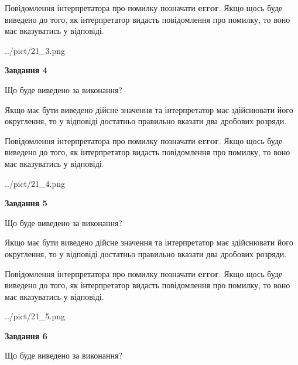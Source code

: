 \documentclass[12pt, ukrainian]{article}
\begin{document}
{\begin {Large}
Повідомлення інтерпретатора про помилку позначати \textbf{error}.
Якщо щось буде виведено до того, як інтерпретатор видасть повідомлення про помилку, 
то воно має вказуватись у відповіді. \par

\begin{center}
	{../pict/21_3.png}
\end{center}
\newpage

{\begin {center}\textbf{Завдання 4}\end {center}}\par
Що буде виведено за виконання? \par

Якщо має бути виведено дійсне значення та інтерпретатор має здійснювати його округлення, 
то у відповіді достатньо правильно вказати два дробових розряди.

Повідомлення інтерпретатора про помилку позначати \textbf{error}.
Якщо щось буде виведено до того, як інтерпретатор видасть повідомлення про помилку, 
то воно має вказуватись у відповіді. \par

\begin{center}
	{../pict/21_4.png}
\end{center}
\newpage

{\begin {center}\textbf{Завдання 5}\end {center}}\par
Що буде виведено за виконання? \par

Якщо має бути виведено дійсне значення та інтерпретатор має здійснювати його округлення, 
то у відповіді достатньо правильно вказати два дробових розряди.

Повідомлення інтерпретатора про помилку позначати \textbf{error}.
Якщо щось буде виведено до того, як інтерпретатор видасть повідомлення про помилку, 
то воно має вказуватись у відповіді. \par

\begin{center}
	{../pict/21_5.png}
\end{center}
\newpage

{\begin {center}\textbf{Завдання 6}\end {center}}\par
Що буде виведено за виконання? \par


\end{Large}}
\end{document}
